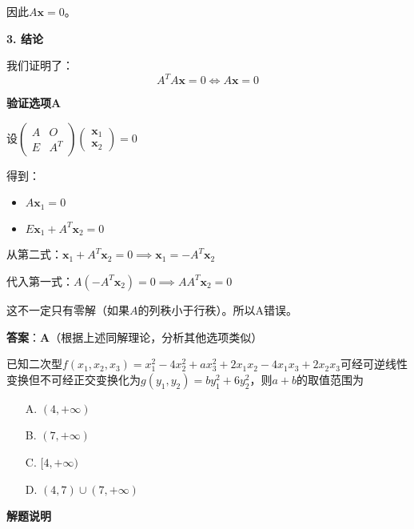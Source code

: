 \documentclass[standard]{ExBook}
\begin{document}
\begin{qitems}
\begin{bbox}
\begin{solution}
            因此$A\mathbf{x}=0$。
            
            \textbf{3. 结论}
            
            我们证明了：$$A^TA\mathbf{x}=0 \iff A\mathbf{x}=0$$
            
            \textbf{验证选项A}
            
            设$\begin{pmatrix} A & O \\ E & A^T \end{pmatrix}\begin{pmatrix} \mathbf{x}_1 \\ \mathbf{x}_2 \end{pmatrix} = 0$
            
            得到：
            \begin{itemize}
                \item $A\mathbf{x}_1 = 0$
                \item $E\mathbf{x}_1 + A^T\mathbf{x}_2 = 0$
            \end{itemize}
            
            从第二式：$\mathbf{x}_1 + A^T\mathbf{x}_2 = 0 \implies \mathbf{x}_1 = -A^T\mathbf{x}_2$
            
            代入第一式：$A(-A^T\mathbf{x}_2) = 0 \implies AA^T\mathbf{x}_2 = 0$
            
            这不一定只有零解（如果$A$的列秩小于行秩）。所以A错误。
            
            \textbf{答案}：\textbf{A}（根据上述同解理论，分析其他选项类似）
        \end{solution}
    \end{bbox}

    \begin{bbox}
        \qitem 已知二次型$f(x_1,x_2,x_3)=x_1^2-4x_2^2+ax_3^2+2x_1x_2-4x_1x_3+2x_2x_3$可经可逆线性变换但不可经正交变换化为$g(y_1,y_2)=by_1^2+6y_2^2$，则$a+b$的取值范围为
        \begin{itemize}
            \item[A.] $(4, +\infty)$
            \item[B.] $(7, +\infty)$
            \item[C.] $[4, +\infty)$
            \item[D.] $(4,7) \cup (7, +\infty)$
        \end{itemize}
        \begin{solution}
            \textbf{解题说明}
            

\end{solution}
\end{bbox}
\end{qitems}
\end{document}
